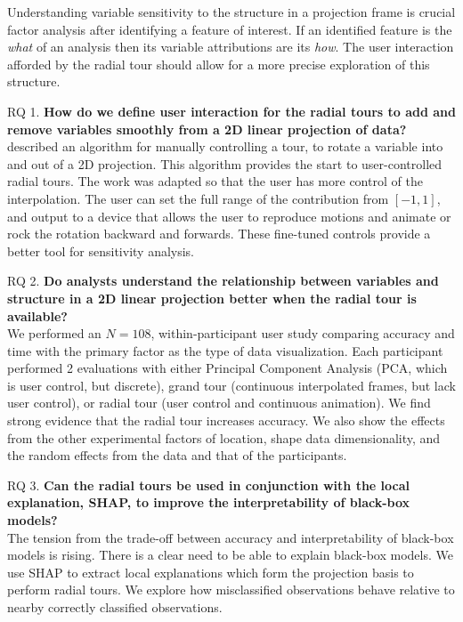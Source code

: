 \documentclass{template/monashthesis}
\begin{document}
Understanding variable sensitivity to the structure in a projection frame is crucial factor analysis after identifying a feature of interest. If an identified feature is the \emph{what} of an analysis then its variable attributions are its \emph{how}. The user interaction afforded by the radial tour should allow for a more precise exploration of this structure.

RQ 1. \textbf{How do we define user interaction for the radial tours to add and remove variables smoothly from a 2D linear projection of data?}\\
\textcite{cook_manual_1997} described an algorithm for manually controlling a tour, to rotate a variable into and out of a 2D projection. This algorithm provides the start to user-controlled radial tours. The work \autocite{spyrison_spinifex_2020} was adapted so that the user has more control of the interpolation. The user can set the full range of the contribution from \([-1, 1]\), and output to a device that allows the user to reproduce motions and animate or rock the rotation backward and forwards. These fine-tuned controls provide a better tool for sensitivity analysis.

RQ 2. \textbf{Do analysts understand the relationship between variables and structure in a 2D linear projection better when the radial tour is available?}\\
We performed an \(N=108\), within-participant user study comparing accuracy and time with the primary factor as the type of data visualization. Each participant performed 2 evaluations with either Principal Component Analysis (PCA, which is user control, but discrete), grand tour (continuous interpolated frames, but lack user control), or radial tour (user control and continuous animation). We find strong evidence that the radial tour increases accuracy. We also show the effects from the other experimental factors of location, shape data dimensionality, and the random effects from the data and that of the participants.

RQ 3. \textbf{Can the radial tours be used in conjunction with the local explanation, SHAP, to improve the interpretability of black-box models?}\\
The tension from the trade-off between accuracy and interpretability of black-box models is rising. There is a clear need to be able to explain black-box models. We use SHAP to extract local explanations which form the projection basis to perform radial tours. We explore how misclassified observations behave relative to nearby correctly classified observations.
\end{document}
